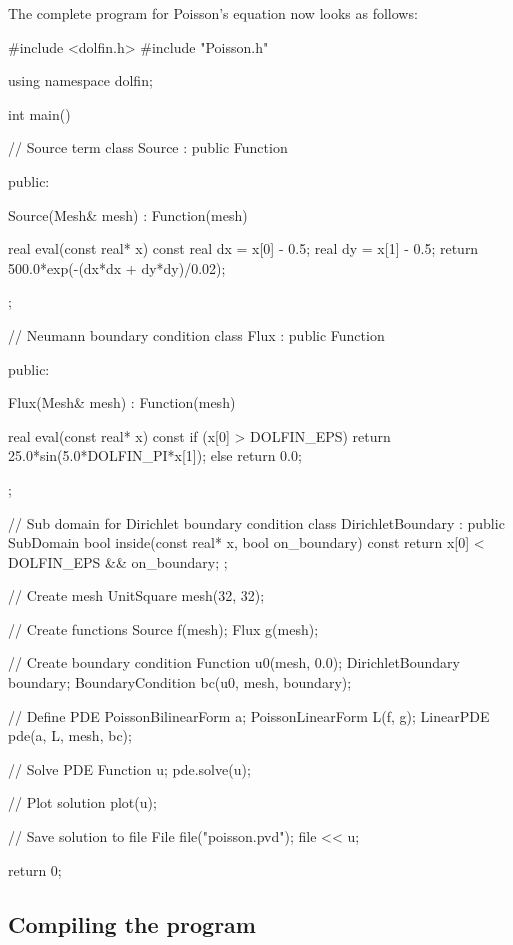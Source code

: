 The complete program for Poisson's equation now looks as follows:
\small
\begin{code}

#include <dolfin.h>
#include "Poisson.h"
  
using namespace dolfin;

int main()
{
  // Source term
  class Source : public Function
  {
  public:
    
    Source(Mesh& mesh) : Function(mesh) {}

    real eval(const real* x) const
    {
      real dx = x[0] - 0.5;
      real dy = x[1] - 0.5;
      return 500.0*exp(-(dx*dx + dy*dy)/0.02);
    }

  };

  // Neumann boundary condition
  class Flux : public Function
  {
  public:

    Flux(Mesh& mesh) : Function(mesh) {}

    real eval(const real* x) const
    {
      if (x[0] > DOLFIN_EPS)
        return 25.0*sin(5.0*DOLFIN_PI*x[1]);
      else
        return 0.0;
    }

  };

  // Sub domain for Dirichlet boundary condition
  class DirichletBoundary : public SubDomain
  {
    bool inside(const real* x, bool on_boundary) const
    {
      return x[0] < DOLFIN_EPS && on_boundary;
    }
  };

  // Create mesh
  UnitSquare mesh(32, 32);

  // Create functions
  Source f(mesh);
  Flux g(mesh);

  // Create boundary condition
  Function u0(mesh, 0.0);
  DirichletBoundary boundary;
  BoundaryCondition bc(u0, mesh, boundary);
  
  // Define PDE
  PoissonBilinearForm a;
  PoissonLinearForm L(f, g);
  LinearPDE pde(a, L, mesh, bc);

  // Solve PDE
  Function u;
  pde.solve(u);

  // Plot solution
  plot(u);

  // Save solution to file
  File file("poisson.pvd");
  file << u;

  return 0;
}
\end{code}
\normalsize

\subsection{Compiling the program}

